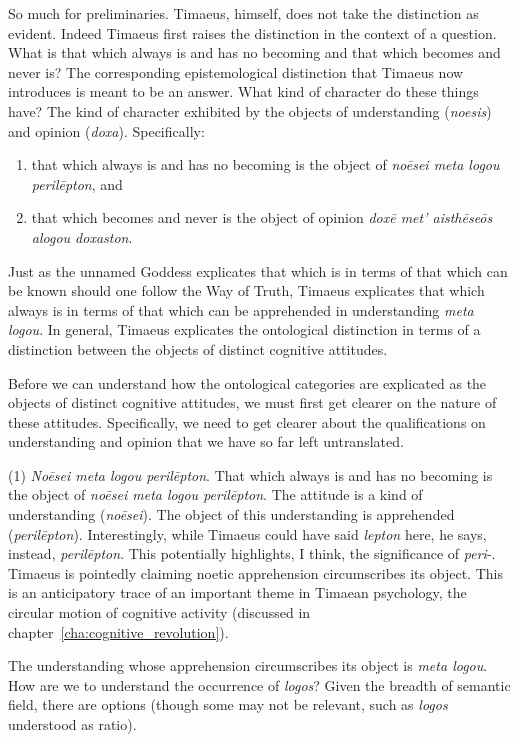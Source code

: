 So much for preliminaries. Timaeus, himself, does not take the distinction as evident. Indeed Timaeus first raises the distinction in the context of a question. What is that which always is and has no becoming and that which becomes and never is? The corresponding epistemological distinction that Timaeus now introduces is meant to be an answer.  What kind of character do these things have? The kind of character exhibited by the objects of understanding (\emph{noesis}) and opinion (\emph{doxa}). Specifically: 
\begin{enumerate}[(1)]
	\item that which always is and has no becoming is the object of \emph{noēsei meta logou perilēpton}, and
	\item that which becomes and never is the object of opinion \emph{doxē met' aisthēseōs alogou doxaston}.
\end{enumerate}
Just as the unnamed Goddess explicates that which is in terms of that which can be known should one follow the Way of Truth, Timaeus explicates that which always is in terms of that which can be apprehended in understanding \emph{meta logou}. In general, Timaeus explicates the ontological distinction in terms of a distinction between the objects of distinct cognitive attitudes.

Before we can understand how the ontological categories are explicated as the objects of distinct cognitive attitudes, we must first get clearer on the nature of these attitudes. Specifically, we need to get clearer about the qualifications on understanding and opinion that we have so far left untranslated. 

(1) \emph{Noēsei meta logou perilēpton}. That which always is and has no becoming is the object of \emph{noēsei meta logou perilēpton}. The attitude is a kind of understanding (\emph{noēsei}). The object of this understanding is apprehended (\emph{perilēpton}). Interestingly, while Timaeus could have said \emph{lepton} here, he says, instead, \emph{perilēpton}. This potentially highlights, I think, the significance of \emph{peri}-. Timaeus is pointedly claiming noetic apprehension circumscribes its object. This is an anticipatory trace of an important theme in Timaean psychology, the circular motion of cognitive activity (discussed in chapter~\ref{cha:cognitive_revolution}).

The understanding whose apprehension circumscribes its object is \emph{meta logou}. How are we to understand the occurrence of \emph{logos}? Given the breadth of semantic field, there are options (though some may not be relevant, such as \emph{logos} understood as ratio). 

